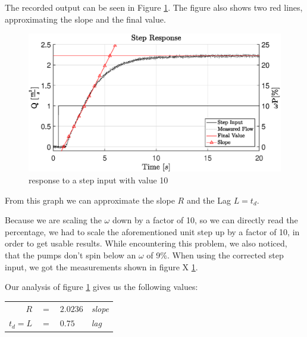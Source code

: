 The recorded output can be seen in Figure \ref{fig:stepin}.
The figure also shows two red lines, approximating the slope and the final value.

\begin{figure}[H]
    \centering
    \includegraphics[width=\textwidth]{figures/07controllerDesign/StepResponseLabeled.eps}
    \caption{response to a step input with value 10}
	\label{fig:stepin}
\end{figure}

From this graph we can approximate the slope $R$ and the Lag $L=t_d$.




Because we are scaling the $\omega$ down by a factor of 10, so we can directly read the percentage,
we had to scale the aforementioned unit step up by a factor of 10,
in order to get usable results.
While encountering this problem, we also noticed, that the pumps don't spin below an $\omega$ of 9\%.
When using the corrected step input, we got the measurements shown in figure X \ref{fig:stepin}.

Our analysis of figure \ref{fig:stepin} gives us the following values:
\\
\begin{tabular}{r c l l}
	$R$ 	& $=$ & $2.0236$ 	& \footnotesize{\textit{slope}}\\
	$t_d=L$	& $=$ & $0.75$ 		& \footnotesize{\textit{lag}}\\
\end{tabular}


